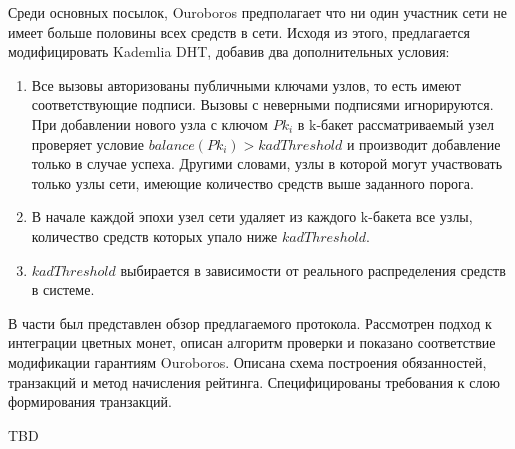 \documentclass[specification,annotation]{itmo-student-thesis}
\begin{document}
Среди основных посылок, Ouroboros предполагает что ни один участник
сети не имеет больше половины всех средств в сети. Исходя из этого,
предлагается модифицировать Kademlia DHT, добавив два дополнительных условия:
\begin{enumerate}
\item Все вызовы авторизованы публичными ключами узлов, то есть имеют
  соответствующие подписи. Вызовы с неверными подписями
  игнорируются. При добавлении нового узла с ключом $Pk_i$ в k-бакет
  рассматриваемый узел проверяет условие $balance(Pk_i) >
  kadThreshold$ и производит добавление только в случае
  успеха. Другими словами, узлы в которой могут участвовать только
  узлы сети, имеющие количество средств выше заданного порога.
\item В начале каждой эпохи узел сети удаляет из каждого k-бакета все
  узлы, количество средств которых упало ниже $kadThreshold$.
\item $kadThreshold$ выбирается в зависимости от реального
  распределения средств в системе.
\end{enumerate}

\chapterconclusion

В части был представлен обзор предлагаемого протокола. Рассмотрен
подход к интеграции цветных монет, описан алгоритм проверки и показано
соответствие модификации гарантиям Ouroboros. Описана схема построения
обязанностей, транзакций и метод начисления рейтинга. Специфицированы
требования к слою формирования транзакций.

\startconclusionpage

TBD

\printmainbibliography
\end{document}
